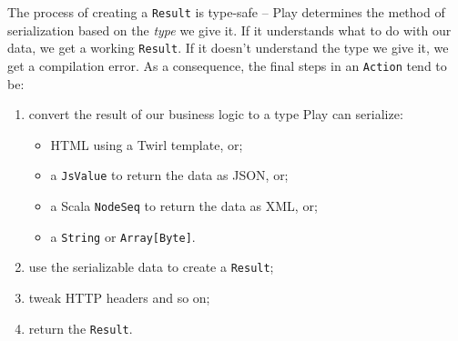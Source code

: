 \documentclass[oneside,11pt,a4paper,]{book}
\begin{document}
The process of creating a \texttt{Result} is type-safe -- Play
determines the method of serialization based on the \emph{type} we give
it. If it understands what to do with our data, we get a working
\texttt{Result}. If it doesn't understand the type we give it, we get a
compilation error. As a consequence, the final steps in an
\texttt{Action} tend to be:

\begin{enumerate}
\def\labelenumi{\arabic{enumi}.}
\item
  convert the result of our business logic to a type Play can serialize:

  \begin{itemize}
  \itemsep1pt\parskip0pt
  \item
    HTML using a Twirl template, or;
  \item
    a \texttt{JsValue} to return the data as JSON, or;
  \item
    a Scala \texttt{NodeSeq} to return the data as XML, or;
  \item
    a \texttt{String} or \texttt{Array{[}Byte{]}}.
  \end{itemize}
\item
  use the serializable data to create a \texttt{Result};
\item
  tweak HTTP headers and so on;
\item
  return the \texttt{Result}.
\end{enumerate}
\end{document}
